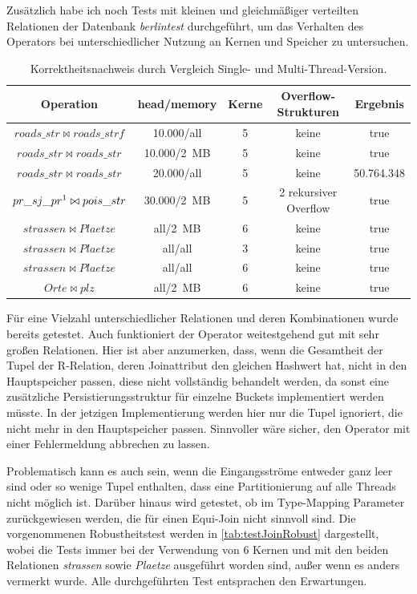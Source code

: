 \documentclass[a4paper,12pt,twoside]{article}
\newcommand{\Fb}[1]{\textit{#1}} %
\begin{document}
Zusätzlich habe ich noch Tests mit kleinen und gleichmäßiger verteilten Relationen der Datenbank \Fb{berlintest} durchgeführt, um das Verhalten des Operators bei unterschiedlicher Nutzung an Kernen und Speicher zu untersuchen. 

\begin{table}
	\centering
	\begin{tabular}{|c|c|c|c|c|}
		\hline 
		Operation & head/memory & Kerne & Overflow-Strukturen & Ergebnis \\ 
		\hline 
		$roads\_str \bowtie roads\_strf$ & 10.000/all & 5 & keine & true \\ 
		\hline 
		$roads\_str \bowtie roads\_str$ & 10.000/2~MB & 5 & keine & true \\ 
		\hline 
		$roads\_str \bowtie roads\_str$ & 20.000/all & 5 & keine & 50.764.348 \\ 
		\hline 
		$pr\_sj\_pr\footnotemark \bowtie pois\_str$ & 30.000/2~MB & 5 & 2 rekursiver Overflow & true \\ 
		\hline 
		$strassen \bowtie Plaetze$ & all/2~MB & 6 & keine  & true \\ 
		\hline
		$strassen \bowtie Plaetze$ & all/all & 3 & keine & true \\ 
		\hline
		$strassen \bowtie Plaetze$ & all/all & 6 & keine & true \\ 
		\hline
		$Orte \bowtie plz$ & all/2~MB & 6 & keine & true \\ 
		\hline
	\end{tabular}
	\caption{\label{tab:testJoin} Korrektheitsnachweis durch Vergleich Single- und Multi-Thread-Version.}
\end{table}


Für eine Vielzahl unterschiedlicher Relationen und deren Kombinationen wurde bereits getestet. Auch funktioniert der Operator weitestgehend gut mit sehr großen Relationen. Hier ist aber anzumerken, dass, wenn die Gesamtheit der Tupel der R-Relation, deren Joinattribut den gleichen Hashwert hat, nicht in den Hauptspeicher passen, diese nicht vollständig behandelt werden, da sonst eine zusätzliche Persistierungsstruktur für einzelne Buckets implementiert werden müsste. In der jetzigen Implementierung werden hier nur die Tupel ignoriert, die nicht mehr in den Hauptspeicher passen. Sinnvoller wäre sicher, den Operator mit einer Fehlermeldung abbrechen zu lassen.

Problematisch kann es auch sein, wenn die Eingangsströme entweder ganz leer sind oder so wenige Tupel enthalten, dass eine Partitionierung auf alle Threads nicht möglich ist. Darüber hinaus wird getestet, ob im Type-Mapping Parameter zurückgewiesen werden, die für einen Equi-Join nicht sinnvoll sind. Die vorgenommenen Robustheitstest werden in \autoref{tab:testJoinRobust} dargestellt, wobei die Tests immer bei der Verwendung von 6 Kernen und mit den beiden Relationen \Fb{strassen} sowie \Fb{Plaetze} ausgeführt worden sind, außer wenn es anders vermerkt wurde. Alle durchgeführten Test entsprachen den Erwartungen.
\end{document}
